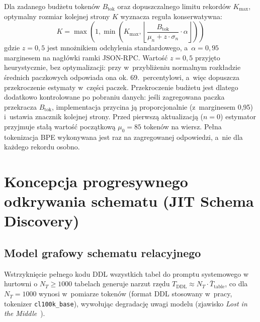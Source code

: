 Dla zadanego budżetu tokenów $B_{\text{tok}}$ oraz dopuszczalnego limitu rekordów $K_{\max}$, optymalny rozmiar kolejnej strony $K$ wyznacza reguła konserwatywna:
\begin{equation}
K = \max\left(1, \min\left(K_{\max}, \left\lfloor \frac{B_{\text{tok}}}{\mu_n + z \cdot \sigma_n} \cdot \alpha \right\rfloor\right)\right)
\label{eq:welford_k_estimate}
\end{equation}
gdzie $z = 0{,}5$ jest mnożnikiem odchylenia standardowego, a~$\alpha = 0{,}95$ marginesem na nagłówki ramki JSON-RPC. Wartość $z = 0{,}5$ przyjęto heurystycznie, bez optymalizacji: przy w~przybliżeniu normalnym rozkładzie średnich paczkowych odpowiada ona ok. 69.~percentylowi, a~więc dopuszcza przekroczenie estymaty w~części paczek. Przekroczenie budżetu jest dlatego dodatkowo kontrolowane po pobraniu danych: jeśli zagregowana paczka przekracza $B_{\text{tok}}$, implementacja przycina ją proporcjonalnie (z~marginesem 0,95) i~ustawia znacznik kolejnej strony. Przed pierwszą aktualizacją ($n = 0$) estymator przyjmuje stałą wartość początkową $\mu_0 = 85$ tokenów na wiersz. Pełna tokenizacja BPE wykonywana jest raz na zagregowanej odpowiedzi, a~nie dla każdego rekordu osobno.


\section{Koncepcja progresywnego odkrywania schematu (JIT Schema Discovery)}
\label{sec:projekt_schema_discovery}

\subsection{Model grafowy schematu relacyjnego}
\label{subsec:projekt_graf_bezskalowy}

Wstrzyknięcie pełnego kodu DDL wszystkich tabel do promptu systemowego w hurtowni o $N_T \ge 1000$ tabelach generuje narzut rzędu $T_{\text{DDL}} \approx N_T \cdot \bar{T}_{\text{table}}$, co dla $N_T = 1000$ wynosi w~pomiarze \wynFullDumpTokens{} tokenów (format DDL stosowany w~pracy, tokenizer \texttt{cl100k\_base}), wywołując degradację uwagi modelu (zjawisko \emph{Lost in the Middle}~\cite{liu2024lostinthemiddle}).

